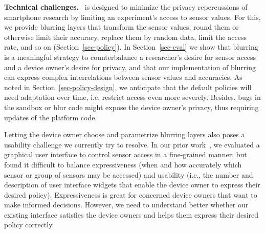 \textbf{Technical challenges.}~
\sysname is designed to minimize the privacy repercussions 
of smartphone research by limiting an experiment's access to sensor values.
For this, we provide blurring layers that transform the sensor 
values, round them or otherwise limit their accuracy, replace them by 
random data, limit the access rate, and so on (Section~\ref{sec-policy}). 
In Section~\ref{sec-eval} we show that blurring is a meaningful strategy to 
counterbalance a researcher's desire for sensor access and a device 
owner's desire for privacy, and that our implementation of blurring 
can express complex interrelations between sensor values and accuracies. 
As noted in Section~\ref{sec-policy-design}, we anticipate that 
the default policies will need adaptation over time, i.e. restrict 
access even more severely.
Besides, bugs in the sandbox or blur code might 
expose the device owner's privacy, thus requiring updates of the 
platform code.


Letting the device owner choose and parametrize blurring layers 
also poses a usability 
challenge we currently try to resolve.
In our prior work~\cite{sensorium, rafetseder2013sensorium}, 
we evaluated a graphical user interface to control sensor access in 
a fine-grained manner, but found it difficult to 
balance expressiveness (when and how accurately which 
sensor or group of sensors may be accessed) and usability (i.e., 
the number and description of user interface widgets that enable 
the device owner to express their desired policy).
Expressiveness is great for concerned device owners 
that want to make informed decisions. 
However, we need to understand better whether our existing interface 
satisfies the device owners and helps them express their desired 
policy correctly.



